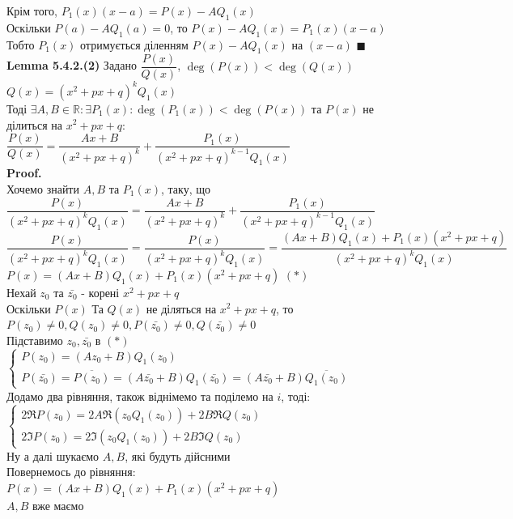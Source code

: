 \documentclass[a4paper, 14pt]{extarticle}
\def\lm#1{\textbf{Lemma {#1}}}
\def\proof{\textbf{Proof.}\\}
\def\bigline{\vspace{5mm}\\}
\def\qed{$\blacksquare$}
\begin{document}
Крім того, $P_1(x)(x-a) = P(x) - AQ_1(x)$\\
Оскільки $P(a) - AQ_1(a) = 0$, то $P(x) -AQ_1(x) = P_1(x)(x-a)$\\
Тобто $P_1(x)$ отримується діленням $P(x)-AQ_1(x)$ на $(x-a)$ \qed
\bigline
\lm{5.4.2.(2)} Задано $\dfrac{P(x)}{Q(x)}$, $\deg(P(x)) < \deg(Q(x))$\\
$Q(x) = (x^2+px+q)^kQ_1(x)$\\
Тоді $\exists A,B \in \mathbb{R}: \exists P_1(x): \deg(P_1(x)) < \deg(P(x))$ та $P(x)$ не ділиться на $x^2+px+q:$\\
$\dfrac{P(x)}{Q(x)} = \dfrac{Ax+B}{(x^2+px+q)^k} + \dfrac{P_1(x)}{(x^2+px+q)^{k-1}Q_1(x)}$\\
\proof
Хочемо знайти $A,B$ та $P_1(x)$, таку, що\\
$\dfrac{P(x)}{(x^2+px+q)^k Q_1(x)} = \dfrac{Ax+B}{(x^2+px+q)^k} + \dfrac{P_1(x)}{(x^2+px+q)^{k-1}Q_1(x)}$\\
$\dfrac{P(x)}{(x^2+px+q)^k Q_1(x)} = \dfrac{P(x)}{(x^2+px+q)^k Q_1(x)} = \dfrac{(Ax+B)Q_1(x)+P_1(x)(x^2+px+q)}{(x^2+px+q)^k Q_1(x)}$\\
$P(x) = (Ax+B)Q_1(x)+P_1(x)(x^2+px+q)$ $(*)$\\
Нехай $z_0$ та $\bar{z_0}$ - корені $x^2+px+q$\\
Оскільки $P(x)$ Та $Q(x)$ не діляться на $x^2+px+q$, то \\ $P(z_0) \neq 0, Q(z_0) \neq 0,P(\bar{z_0}) \neq 0, Q(\bar{z_0}) \neq 0$\\
Підставимо $z_0, \bar{z_0}$ в $(*)$\\
$\begin{cases}
P(z_0) = (Az_0+B)Q_1(z_0) \\
P(\bar{z_0}) = \overline{P(z_0)} = (A\bar{z_0}+B)Q_1(\bar{z_0}) = (A\bar{z_0}+B)\overline{Q_1(z_0)}
\end{cases}
$\\
Додамо два рівняння, також віднімемо та поділемо на $i$, тоді:\\
$\begin{cases}
2 \Re P(z_0) = 2A \Re (z_0 Q_1(z_0)) + 2B \Re Q(z_0) \\
2 \Im P(z_0) = 2 \Im(z_0 Q_1(z_0)) + 2B \Im Q(z_0)
\end{cases}
$\\
Ну а далі шукаємо $A,B$, які будуть дійсними\\
Повернемось до рівняння:\\
$P(x) = (Ax+B)Q_1(x) + P_1(x)(x^2+px+q)$\\
$A,B$ вже маємо\\
\end{document}
